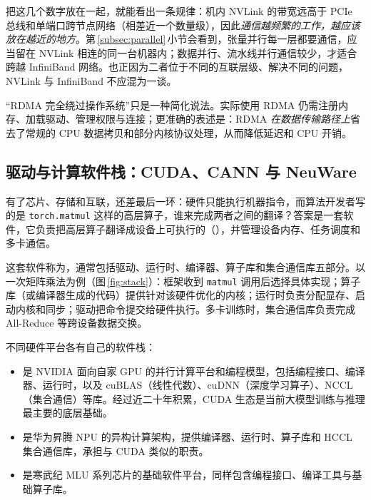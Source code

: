 

把这几个数字放在一起，就能看出一条规律：机内 NVLink 的带宽远高于 PCIe 总线和单端口跨节点网络（相差近一个数量级），因此\emph{通信越频繁的工作，越应该放在越近的地方}。第\,\ref{subsec:parallel}\,小节会看到，张量并行每一层都要通信，应当留在 NVLink 相连的同一台机器内；数据并行、流水线并行通信较少，才适合跨越 InfiniBand 网络。也正因为二者位于不同的互联层级、解决不同的问题，NVLink 与 InfiniBand 不应混为一谈。

\begin{pitfall}
“RDMA 完全绕过操作系统”只是一种简化说法。实际使用 RDMA 仍需注册内存、加载驱动、管理权限与连接；更准确的表述是：RDMA \emph{在数据传输路径上}省去了常规的 CPU 数据拷贝和部分内核协议处理，从而降低延迟和 CPU 开销。
\end{pitfall}

\subsection{驱动与计算软件栈：CUDA、CANN 与 NeuWare}
\label{subsec:stack}

有了芯片、存储和互联，还差最后一环：硬件只能执行机器指令，而算法开发者写的是 \texttt{torch.matmul} 这样的高层算子，谁来完成两者之间的翻译？答案是一套软件，它负责把高层算子翻译成设备上可执行的（），并管理设备内存、任务调度和多卡通信。

这套软件称为，通常包括驱动、运行时、编译器、算子库和集合通信库五部分。以一次矩阵乘法为例（图\,\ref{fig:stack}）：框架收到 \texttt{matmul} 调用后选择具体实现；算子库（或编译器生成的代码）提供针对该硬件优化的内核；运行时负责分配显存、启动内核和同步；驱动把命令提交给硬件执行。多卡训练时，集合通信库负责完成 All-Reduce 等跨设备数据交换。



不同硬件平台各有自己的软件栈：
\begin{itemize}
  \item {} 是 NVIDIA 面向自家 GPU 的并行计算平台和编程模型，包括编程接口、编译器、运行时，以及 cuBLAS（线性代数）、cuDNN（深度学习算子）、NCCL（集合通信）等库\cite{nvidia2024cuda}。经过近二十年积累，CUDA 生态是当前大模型训练与推理最主要的底层基础。
  \item {} 是华为昇腾 NPU 的异构计算架构，提供编译器、运行时、算子库和 HCCL 集合通信库，承担与 CUDA 类似的职责。
  \item {} 是寒武纪 MLU 系列芯片的基础软件平台，同样包含编程接口、编译工具与基础算子库。
\end{itemize}

